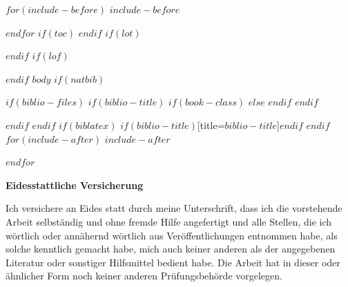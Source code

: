 \documentclass[$if(fontsize)$$fontsize$,$endif$$if(lang)$$lang$,$endif$$if(papersize)$$papersize$,$endif$$for(classoption)$$classoption$$sep$,$endfor$]{$documentclass$}
\begin{document}
$for(include-before)$
$include-before$

$endfor$
$if(toc)$
{
\hypersetup{linkcolor=black}
\setcounter{tocdepth}{$toc-depth$}
\tableofcontents
}
$endif$
$if(lot)$
\newpage
\listoftables
$endif$
$if(lof)$
\newpage
\listoffigures
$endif$
\newpage
{} 
$body$
$if(natbib)$

$if(biblio-files)$
$if(biblio-title)$
$if(book-class)$
\renewcommand\bibname{$biblio-title$}
$else$
\renewcommand\refname{$biblio-title$}
$endif$
$endif$


$endif$
$endif$
$if(biblatex)$
\printbibliography$if(biblio-title)$[title=$biblio-title$]$endif$
$endif$
$for(include-after)$
$include-after$

$endfor$

\newpage
\textbf{Eidesstattliche Versicherung}

\bigskip

Ich versichere an Eides statt durch meine Unterschrift, dass ich die vorstehende Arbeit selbständig und ohne fremde Hilfe angefertigt und alle Stellen, die ich wörtlich oder annähernd wörtlich aus Veröffentlichungen entnommen habe, als solche kenntlich gemacht habe, mich auch keiner anderen als der angegebenen Literatur oder sonstiger Hilfsmittel bedient habe. Die Arbeit hat in dieser oder ähnlicher Form noch keiner anderen Prüfungsbehörde vorgelegen.

\vspace{1cm}
\rule{0pt}{2\baselineskip} %
\par\noindent{} \hfill\makebox[2.25in]{\hrulefill}%
\par\noindent\makebox[2.25in][l]{} \hfill{}%
\end{document}
